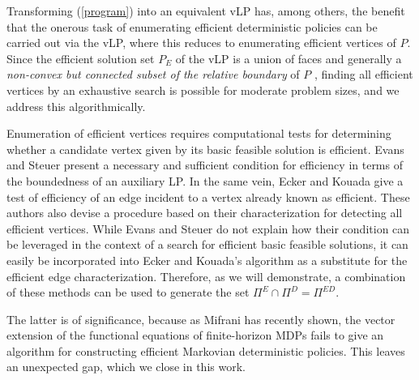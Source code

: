 \documentclass{article}
\theoremstyle{definition}
\numberwithin{equation}{section}
\begin{document}
{Transforming (\ref{program}) into  an equivalent vLP has, among others, the
benefit that
the onerous task of 
enumerating efficient deterministic policies can be carried out 
via the vLP, where this reduces to
enumerating efficient vertices of $P$. 
Since the efficient solution set $P_E$ of the vLP is a union of faces and generally a {\it non-convex but connected subset of the relative boundary} of $P$ \cite{3}, 
finding all efficient vertices by an exhaustive search is possible
for moderate problem sizes, and we address this algorithmically.



Enumeration of efficient vertices requires
computational tests for determining whether a candidate
vertex given by its basic feasible solution is efficient. Evans and Steuer \cite{7} present a necessary and sufficient condition for efficiency 
in terms of the boundedness of an auxiliary LP. In
the same vein, Ecker and Kouada \cite{6} give a test of
efficiency of an edge incident to a vertex already known as efficient. 
These authors also devise a procedure based on their characterization for detecting all efficient vertices. While Evans and Steuer do not explain how their condition can be leveraged in the context of a search for efficient basic feasible solutions, it can easily be incorporated into Ecker and Kouada's algorithm as a substitute for the efficient edge characterization.
Therefore, as we will demonstrate,
a combination of these methods 
can be used to generate the set $\Pi^{E} \cap \Pi^{D}= \Pi^{ED}$. 

The latter is of significance, 
because as Mifrani \cite{13} has recently shown, the vector extension of the functional equations of finite-horizon MDPs \cite{21} fails to give
an algorithm for constructing efficient Markovian deterministic policies. This leaves an unexpected  gap, which we 
close in this work. 
\\

}
\end{document}
